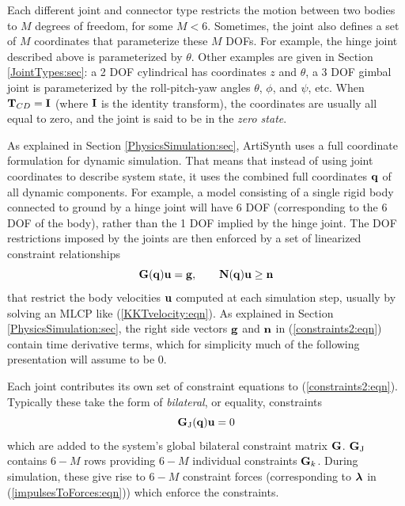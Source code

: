 Each different joint and connector type restricts the motion between
two bodies to $M$ degrees of freedom, for some $M < 6$.  Sometimes,
the joint also defines a set of $M$ coordinates that parameterize
these $M$ DOFs. For example, the hinge joint described above is
parameterized by $\theta$. Other examples are given in
Section \ref{JointTypes:sec}: a 2 DOF cylindrical has coordinates $z$
and $\theta$, a 3 DOF gimbal joint is parameterized by the
roll-pitch-yaw angles $\theta$, $\phi$, and $\psi$, etc.  When
${\bf T}_{CD} = {\bf I}$ (where ${\bf I}$ is the identity transform), the coordinates
are usually all equal to zero, and the joint is said to be in the {\it
zero state}.

As explained in Section \ref{PhysicsSimulation:sec}, ArtiSynth uses a
full coordinate formulation for dynamic simulation. That means that
instead of using joint coordinates to describe system state, it uses
the combined full coordinates ${\bf q}$ of all dynamic components. For
example, a model consisting of a single rigid body connected to ground
by a hinge joint will have 6 DOF (corresponding to the 6 DOF of the
body), rather than the 1 DOF implied by the hinge joint.  The DOF
restrictions imposed by the joints are then enforced by a set of
linearized constraint relationships
%
\begin{equation}
{\bf G}({\bf q}) {\bf u} = {\bf g}, \qquad {\bf N}({\bf q}) {\bf u} \ge {\bf n}
\label{constraints2:eqn}
\end{equation}
%
that restrict the body velocities ${\bf u}$ computed at each simulation
step, usually by solving an MLCP like (\ref{KKTvelocity:eqn}). As
explained in Section \ref{PhysicsSimulation:sec}, the right side
vectors ${\bf g}$ and ${\bf n}$ in (\ref{constraints2:eqn}) contain time
derivative terms, which for simplicity much of the following
presentation will assume to be 0.

Each joint contributes its own set of constraint equations to
(\ref{constraints2:eqn}). Typically these take the form of {\it
bilateral}, or equality, constraints
%
\begin{equation}
{\bf G}_\text{J}({\bf q}) {\bf u} = 0
\label{bilateralG:eqn}
\end{equation}
%
which are added to the system's global bilateral constraint matrix
${\bf G}$. ${\bf G}_\text{J}$ contains $6 - M$ rows providing $6 - M$ individual
constraints ${\bf G}_k$.
During simulation, these give rise to $6 - M$ constraint
forces (corresponding to $\boldsymbol\lambda$ in (\ref{impulsesToForces:eqn}))
which enforce the constraints.

